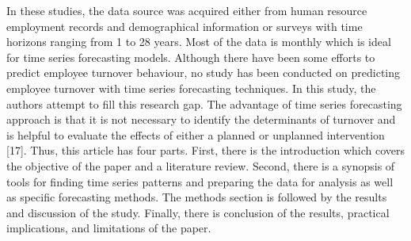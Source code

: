 In these studies, the data source was acquired either from human resource employment records and demographical information or surveys with time horizons ranging from 1 to 28 years. Most of the data is monthly which is ideal for time series forecasting models.
Although there have been some efforts to predict employee turnover behaviour, no study has been conducted on predicting employee turnover with time series forecasting techniques. In this study, the authors attempt to fill this research gap. The advantage of time series forecasting approach is that it is not necessary to identify the determinants of turnover and is helpful to evaluate the effects of either a planned or unplanned intervention [17].  
Thus, this article has four parts. First, there is the introduction which covers the objective of the paper and a literature review. Second, there is a synopsis of tools for finding time series patterns and preparing the data for analysis as well as specific forecasting methods. The methods section is followed by the results and discussion of the study. Finally, there is conclusion of the results, practical implications, and limitations of the paper. 
 
